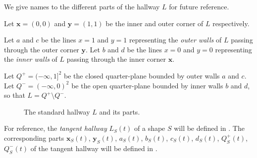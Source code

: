 We give names to the different parts of the hallway \(L\) for future reference.

\begin{definition}

Let \(\mathbf{x} = (0, 0)\) and \(\mathbf{y} = (1, 1)\) be the inner and outer corner of \(L\) respectively.

\label{def:hallway-corners}
\end{definition}

\begin{definition}

Let \(a\) and \(c\) be the lines \(x=1\) and \(y=1\) representing the \emph{outer walls} of \(L\) passing through the outer corner \(\mathbf{y}\).
Let \(b\) and \(d\) be the lines \(x=0\) and \(y=0\) representing the \emph{inner walls} of \(L\) passing through the inner corner \(\mathbf{x}\).

\label{def:hallway-walls}
\end{definition}

\begin{definition}

Let \(Q^+ = (-\infty, 1]^2\) be the closed quarter-plane bounded by outer walls \(a\) and \(c\). Let \(Q^- = (-\infty, 0)^2\) be the open quarter-plane bounded by inner walls \(b\) and \(d\), so that \(L = Q^+ \setminus Q^-\).

\label{def:hallway-regions}
\end{definition}

\begin{figure}
\centering

\caption{The standard hallway \(L\) and its parts.}
\label{fig:hallway-detailed}
\end{figure}

For reference, the \emph{tangent hallway} \(L_S(t)\) of a shape \(S\) will be defined in . The corresponding parts \(\mathbf{x}_S(t)\), \(\mathbf{y}_S(t)\), \(a_S(t)\), \(b_S(t)\), \(c_S(t)\), \(d_S(t)\), \(Q^+_S(t)\), \(Q^-_S(t)\) of the tangent hallway will be defined in .